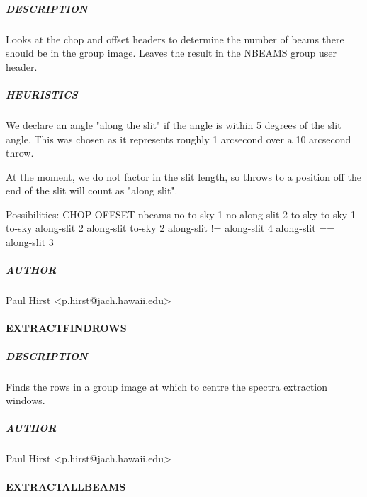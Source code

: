 \documentclass[twoside,11pt]{article}
\renewcommand{\_}{\texttt{\symbol{95}}}
\begin{document}
\subparagraph*{DESCRIPTION\label{_EXTRACT_DETERMINE_NBEAMS__DESCRIPTION}}

Looks at the chop and offset headers to determine the number of beams
there should be in the group image. Leaves the result in the NBEAMS
group user header.

\subparagraph*{HEURISTICS\label{_EXTRACT_DETERMINE_NBEAMS__HEURISTICS}}

We declare an angle "along the slit" if the angle is within 5 degrees
of the slit angle. This was chosen as it represents roughly 1
arcsecond over a 10 arcsecond throw.



At the moment, we do not factor in the slit length, so throws to a
position off the end of the slit will count as "along slit".



Possibilities:     CHOP          OFFSET      nbeams
                   no            to-sky      1
                   no            along-slit  2
                   to-sky        to-sky      1
                   to-sky        along-slit  2
                   along-slit    to-sky      2
                   along-slit != along-slit  4
                   along-slit == along-slit  3

\subparagraph*{AUTHOR\label{_EXTRACT_DETERMINE_NBEAMS__AUTHOR}}

Paul Hirst <p.hirst@jach.hawaii.edu>

\paragraph*{\_EXTRACT\_FIND\_ROWS\_\label{_EXTRACT_FIND_ROWS_}}



\subparagraph*{DESCRIPTION\label{_EXTRACT_FIND_ROWS__DESCRIPTION}}

Finds the rows in a group image at which to centre the spectra 
extraction windows.

\subparagraph*{AUTHOR\label{_EXTRACT_FIND_ROWS__AUTHOR}}

Paul Hirst <p.hirst@jach.hawaii.edu>

\paragraph*{\_EXTRACT\_ALL\_BEAMS\_\label{_EXTRACT_ALL_BEAMS_}}
\end{document}
